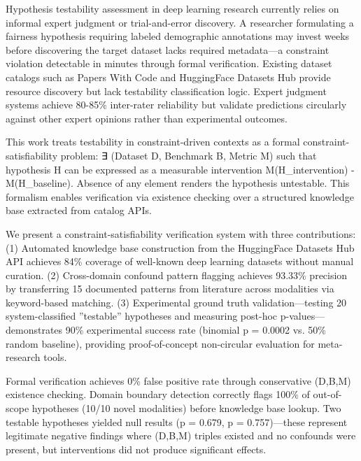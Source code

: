 
Hypothesis testability assessment in deep learning research currently relies on informal expert judgment or trial-and-error discovery. A researcher formulating a fairness hypothesis requiring labeled demographic annotations may invest weeks before discovering the target dataset lacks required metadata---a constraint violation detectable in minutes through formal verification. Existing dataset catalogs such as Papers With Code and HuggingFace Datasets Hub provide resource discovery but lack testability classification logic. Expert judgment systems achieve 80-85\% inter-rater reliability but validate predictions circularly against other expert opinions rather than experimental outcomes.

This work treats testability in constraint-driven contexts as a formal constraint-satisfiability problem: ∃ (Dataset D, Benchmark B, Metric M) such that hypothesis H can be expressed as a measurable intervention M(H\_intervention) - M(H\_baseline). Absence of any element renders the hypothesis untestable. This formalism enables verification via existence checking over a structured knowledge base extracted from catalog APIs.

We present a constraint-satisfiability verification system with three contributions: (1) Automated knowledge base construction from the HuggingFace Datasets Hub API achieves 84\% coverage of well-known deep learning datasets without manual curation. (2) Cross-domain confound pattern flagging achieves 93.33\% precision by transferring 15 documented patterns from literature across modalities via keyword-based matching. (3) Experimental ground truth validation---testing 20 system-classified ''testable'' hypotheses and measuring post-hoc p-values---demonstrates 90\% experimental success rate (binomial p = 0.0002 vs. 50\% random baseline), providing proof-of-concept non-circular evaluation for meta-research tools.

Formal verification achieves 0\% false positive rate through conservative (D,B,M) existence checking. Domain boundary detection correctly flags 100\% of out-of-scope hypotheses (10/10 novel modalities) before knowledge base lookup. Two testable hypotheses yielded null results (p = 0.679, p = 0.757)---these represent legitimate negative findings where (D,B,M) triples existed and no confounds were present, but interventions did not produce significant effects.
